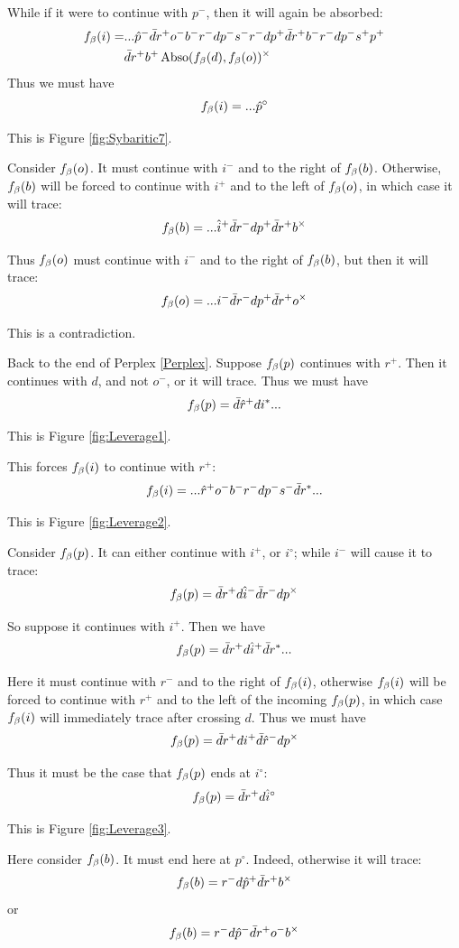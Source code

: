 While if it were to continue with $p^-$, then it will again be absorbed:
\begin{align*}
    f_\beta(i) =& ...\hat{p}^- \bar{d} r^+ o^- b^- r^- d p^- s^- r^- d p^+ \bar{d} r^+ b^- r^- d p^- s^+ p^+\\
    &\bar{d} r^+ b^+ \operatorname{Abso}(f_\beta(d), f_\beta(o))^\times
\end{align*}
Thus we must have 
\[
f_\beta(i) = ... \hat{p}^\circ
\]

This is Figure \ref{fig:Sybaritic7}.

Consider $f_\beta(o)$. It must continue with $i^-$ and to the right of $f_\beta(b)$. Otherwise, $f_\beta(b)$ will be forced to continue with $i^+$ and to the left of $f_\beta(o)$, in which case it will trace:
\[
f_\beta(b) = ...\hat{i}^+ \bar{d} r^- d p^+ \bar{d} r^+ b^\times
\]

Thus $f_\beta(o)$ must continue with $i^-$ and to the right of $f_\beta(b)$, but then it will trace:
\[
f_\beta(o) = ...i^-\bar{d} r^- d p^+ \bar{d} r^+ o^\times
\]

This is a contradiction.

\label{Leverage}
Back to the end of Perplex \ref{Perplex}. Suppose $f_\beta(p)$ continues with $r^+$. Then it continues with $d$, and not $o^-$, or it will trace. Thus we must have
\[
f_\beta(p) = \bar{d} \hat{r}^+ d i^*...
\]

This is Figure \ref{fig:Leverage1}.

This forces $f_\beta(i)$ to continue with $r^+$:
\[
f_\beta(i) =...\hat{r}^+ o^- b^- r^- d p^- s^- \bar{d} r^*...
\]

This is Figure \ref{fig:Leverage2}.

Consider $f_\beta(p)$. It can either continue with $i^+$, or $i^\circ$; while $i^-$ will cause it to trace:
\[
f_\beta(p) = \bar{d} r^+ d \hat{i}^- \bar{d} r^- d p^\times
\]

So suppose it continues with $i^+$. Then we have
\[
f_\beta(p) = \bar{d} r^+ d \hat{i}^+ \bar{d} r^*...
\]

Here it must continue with $r^-$ and to the right of $f_\beta(i)$, otherwise $f_\beta(i)$ will be forced to continue with $r^+$ and to the left of the incoming $f_\beta(p)$, in which case $f_\beta(i)$ will immediately trace after crossing $d$. Thus we must have
\[
f_\beta(p) = \bar{d} r^+ d i^+ \bar{d} \hat{r}^- d p^\times
\]

Thus it must be the case that $f_\beta(p)$ ends at $i^\circ$:
\[
f_\beta(p) = \bar{d} r^+ d \hat{i}^\circ
\]

This is Figure \ref{fig:Leverage3}.

Here consider $f_\beta(b)$. It must end here at $p^\circ$. Indeed, otherwise it will trace:
\[
f_\beta(b) = r^- d \hat{p}^+ \bar{d} r^+ b^\times
\]
or
\[
f_\beta(b) = r^- d \hat{p}^- \bar{d} r^+ o^- b^\times
\]

